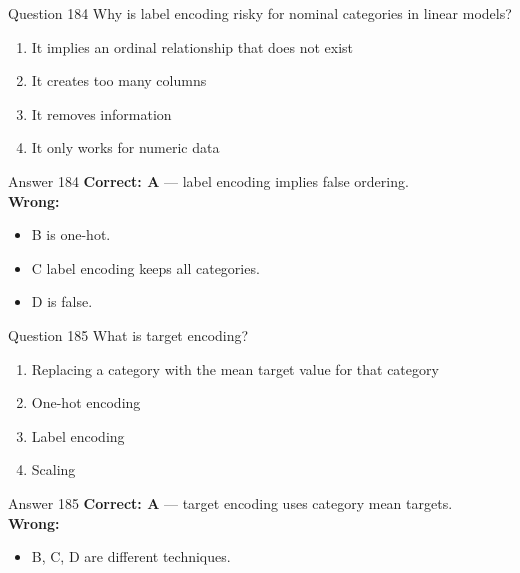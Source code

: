 \documentclass[aspectratio=169,11pt]{beamer}
\begin{document}
	\begin{frame}{Question 184}
		Why is label encoding risky for nominal categories in linear models?
		\begin{enumerate}[label=\Alph*.]
			\item It implies an ordinal relationship that does not exist
			\item It creates too many columns
			\item It removes information
			\item It only works for numeric data
		\end{enumerate}
	\end{frame}
	\begin{frame}{Answer 184}
		\textbf{Correct: A} --- label encoding implies false ordering.\\
		\vspace{0.5em}
		\textbf{Wrong:}
		\begin{itemize}
			\item B is one-hot.
			\item C label encoding keeps all categories.
			\item D is false.
		\end{itemize}
	\end{frame}
	
	\begin{frame}{Question 185}
		What is target encoding?
		\begin{enumerate}[label=\Alph*.]
			\item Replacing a category with the mean target value for that category
			\item One-hot encoding
			\item Label encoding
			\item Scaling
		\end{enumerate}
	\end{frame}
	\begin{frame}{Answer 185}
		\textbf{Correct: A} --- target encoding uses category mean targets.\\
		\vspace{0.5em}
		\textbf{Wrong:}
		\begin{itemize}
			\item B, C, D are different techniques.
		\end{itemize}
	\end{frame}
	
\end{document}
